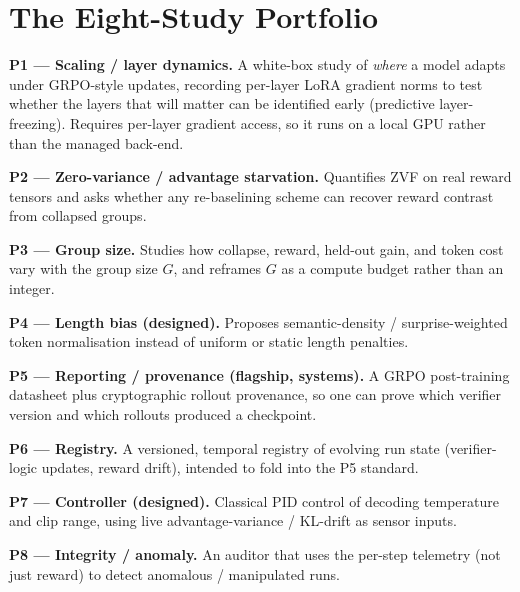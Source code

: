 \section{The Eight-Study Portfolio}
\label{sec:portfolio}

\textbf{P1 --- Scaling / layer dynamics.} A white-box study of \emph{where} a model
adapts under GRPO-style updates, recording per-layer LoRA gradient norms to test
whether the layers that will matter can be identified early (predictive
layer-freezing). Requires per-layer gradient access, so it runs on a local GPU
rather than the managed back-end.

\textbf{P2 --- Zero-variance / advantage starvation.} Quantifies ZVF on real reward
tensors and asks whether any re-baselining scheme can recover reward contrast from
collapsed groups.

\textbf{P3 --- Group size.} Studies how collapse, reward, held-out gain, and token
cost vary with the group size $G$, and reframes $G$ as a compute budget rather than
an integer.

\textbf{P4 --- Length bias (designed).} Proposes semantic-density /
surprise-weighted token normalisation instead of uniform or static length penalties.

\textbf{P5 --- Reporting / provenance (flagship, systems).} A GRPO post-training
datasheet plus cryptographic rollout provenance, so one can prove which verifier
version and which rollouts produced a checkpoint.


\textbf{P6 --- Registry.} A versioned, temporal registry of evolving run state
(verifier-logic updates, reward drift), intended to fold into the P5 standard.

\textbf{P7 --- Controller (designed).} Classical PID control of decoding temperature
and clip range, using live advantage-variance / KL-drift as sensor inputs.

\textbf{P8 --- Integrity / anomaly.} An auditor that uses the per-step telemetry
(not just reward) to detect anomalous / manipulated runs.

